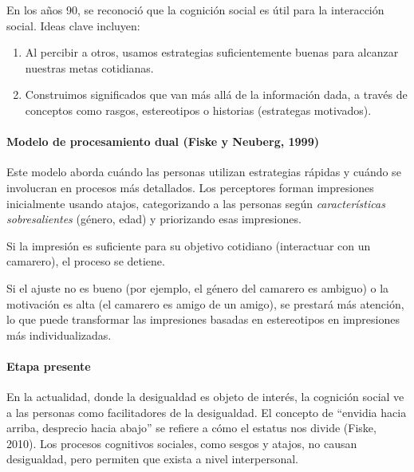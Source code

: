 \documentclass[
]{website}
\providecommand{\tightlist}{%
  \setlength{\itemsep}{0pt}\setlength{\parskip}{0pt}}
\begin{document}
En los años 90, se reconoció que la cognición social es útil para la interacción social. Ideas clave incluyen:

\begin{enumerate}
\def\labelenumi{\arabic{enumi}.}
\tightlist
\item
  Al percibir a otros, usamos estrategias suficientemente buenas para alcanzar nuestras metas cotidianas.
\item
  Construimos significados que van más allá de la información dada, a través de conceptos como rasgos, estereotipos o historias (estrategas motivados).
\end{enumerate}

\paragraph*{Modelo de procesamiento dual (Fiske y Neuberg, 1999)}\label{modelo-de-procesamiento-dual-fiske-y-neuberg-1999}

Este modelo aborda cuándo las personas utilizan estrategias rápidas y cuándo se involucran en procesos más detallados. Los perceptores forman impresiones inicialmente usando atajos, categorizando a las personas según \emph{características sobresalientes} (género, edad) y priorizando esas impresiones.

Si la impresión es suficiente para su objetivo cotidiano (interactuar con un camarero), el proceso se detiene.

Si el ajuste no es bueno (por ejemplo, el género del camarero es ambiguo) o la motivación es alta (el camarero es amigo de un amigo), se prestará más atención, lo que puede transformar las impresiones basadas en estereotipos en impresiones más individualizadas.

\paragraph*{Etapa presente}\label{etapa-presente}

En la actualidad, donde la desigualdad es objeto de interés, la cognición social ve a las personas como facilitadores de la desigualdad. El concepto de ``envidia hacia arriba, desprecio hacia abajo'' se refiere a cómo el estatus nos divide (Fiske, 2010). Los procesos cognitivos sociales, como sesgos y atajos, no causan desigualdad, pero permiten que exista a nivel interpersonal.
\end{document}

